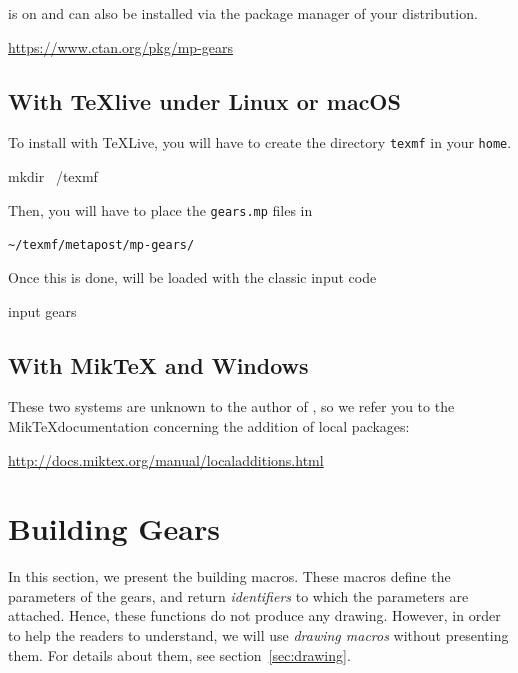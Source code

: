 \documentclass[english]{ltxdoc}
\begin{document}
\mpgears is on \ctan{} and can also be installed via the package manager of your
distribution.

\begin{center}
  \url{https://www.ctan.org/pkg/mp-gears}
\end{center}


\subsection{With \TeX live under Linux or macOS}

To install \mpgears with \TeX Live, you will have to create the directory
\lstinline+texmf+  in your \lstinline+home+. 

\begin{commandshell}
mkdir ~/texmf
\end{commandshell}

Then, you will have to place the \lstinline+gears.mp+  files in 
\begin{center}
  \lstinline+~/texmf/metapost/mp-gears/+
\end{center}


Once this is done, \mpgears will be loaded with the classic \MP{}
input code
\begin{mpcode}
input gears
\end{mpcode}

\subsection{With Mik\TeX{} and Windows}

These two systems are unknown to the author of \mpgears, so we
refer you to the Mik\TeX documentation concerning the addition of local packages:
\begin{center}
  \url{http://docs.miktex.org/manual/localadditions.html}
\end{center}

\section{Building Gears}

In this section, we present the building macros. These macros define the
parameters of the gears, and return \emph{identifiers} to which the parameters
are attached. Hence, these functions do not produce any drawing. However, in
order to help the readers to understand, we will use \emph{drawing macros}
without presenting them. For details about them, see section~\ref{sec:drawing}.
\end{document}
